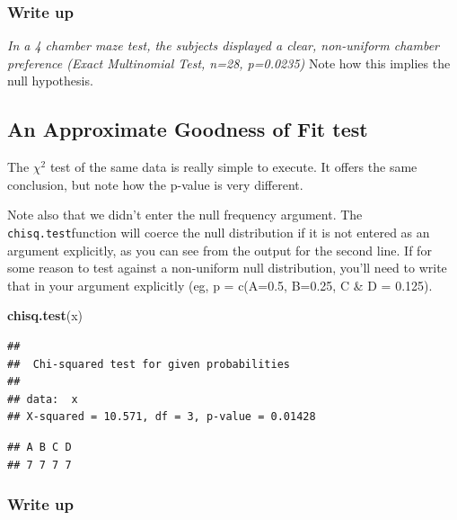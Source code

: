 \documentclass[]{book}
\newenvironment{Shaded}{\begin{snugshade}}{\end{snugshade}}
\newcommand{\KeywordTok}[1]{\textcolor[rgb]{0.13,0.29,0.53}{\textbf{#1}}}
\newcommand{\NormalTok}[1]{#1}
\newcommand{\OperatorTok}[1]{\textcolor[rgb]{0.81,0.36,0.00}{\textbf{#1}}}
\begin{document}
\hypertarget{write-up-1}{%
\subsubsection{Write up}\label{write-up-1}}

\emph{In a 4 chamber maze test, the subjects displayed a clear, non-uniform chamber preference (Exact Multinomial Test, n=28, p=0.0235)} Note how this implies the null hypothesis.

\hypertarget{an-approximate-goodness-of-fit-test}{%
\subsection{An Approximate Goodness of Fit test}\label{an-approximate-goodness-of-fit-test}}

The \(\chi^2\) test of the same data is really simple to execute. It offers the same conclusion, but note how the p-value is very different.

Note also that we didn't enter the null frequency argument. The \texttt{chisq.test}function will coerce the null distribution if it is not entered as an argument explicitly, as you can see from the output for the second line. If for some reason to test against a non-uniform null distribution, you'll need to write that in your argument explicitly (eg, p = c(A=0.5, B=0.25, C \& D = 0.125).

\begin{Shaded}
\begin{Highlighting}[]
\KeywordTok{chisq.test}\NormalTok{(x)}
\end{Highlighting}
\end{Shaded}

\begin{verbatim}
## 
##  Chi-squared test for given probabilities
## 
## data:  x
## X-squared = 10.571, df = 3, p-value = 0.01428
\end{verbatim}

\begin{Shaded}
\end{Shaded}

\begin{verbatim}
## A B C D 
## 7 7 7 7
\end{verbatim}

\hypertarget{write-up-2}{%
\subsubsection{Write up}\label{write-up-2}}
\end{document}
